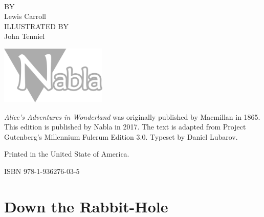\documentclass[12pt,openany]{memoir}
\begin{document}
\frontmatter

\vspace*{\droptitle}
\begin{center}
\vspace*{1.0in}
 \\
\vspace*{2.6in}
\tiny{BY} \\
\Large{Lewis Carroll} \\
\vspace*{0.6in}
\tiny{ILLUSTRATED BY} \\
\Large{John Tenniel} \\
\end{center}
\thispagestyle{empty}

\newpage
\vspace*{1.2in}
\begin{center}
\includegraphics[width=2.0in]{nabla} \\
\end{center}
\vspace*{0.6in}

\noindent
\textit{Alice's Adventures in Wonderland} was originally published by Macmillan in 1865.
This edition is published by Nabla in 2017.
The text is adapted from Project Gutenberg's Millennium Fulcrum Edition 3.0.
Typeset by Daniel Lubarov.

\vspace*{0.4in}

\noindent
Printed in the United State of America.

\vspace*{0.4in}

\noindent
ISBN 978-1-936276-03-5
\thispagestyle{empty}

\newpage
{}
\renewcommand*{\cftchapterfont}{\normalfont}
\renewcommand*{\cftchapterpagefont}{\normalfont}
\begin{large}
\tableofcontents*
\end{large}
\thispagestyle{empty}

\mainmatter

\chapter{Down the Rabbit-Hole}
\end{document}
